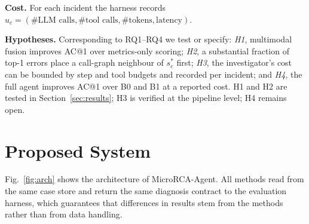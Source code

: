\documentclass[conference]{IEEEtran}
\begin{document}
\textbf{Cost.} For each incident the harness records $u_c=(\#\text{LLM calls}, \#\text{tool calls}, \#\text{tokens}, \text{latency})$.

\textbf{Hypotheses.} Corresponding to RQ1--RQ4 we test or specify: \emph{H1}, multimodal fusion improves AC@1 over metrics-only scoring; \emph{H2}, a substantial fraction of top-1 errors place a call-graph neighbour of $s^\ast_c$ first; \emph{H3}, the investigator's cost can be bounded by step and tool budgets and recorded per incident; and \emph{H4}, the full agent improves AC@1 over B0 and B1 at a reported cost. H1 and H2 are tested in Section~\ref{sec:results}; H3 is verified at the pipeline level; H4 remains open.

\section{Proposed System}\label{sec:system}

Fig.~\ref{fig:arch} shows the architecture of MicroRCA-Agent. All methods read from the same case store and return the same diagnosis contract to the evaluation harness, which guarantees that differences in results stem from the methods rather than from data handling.
\end{document}
